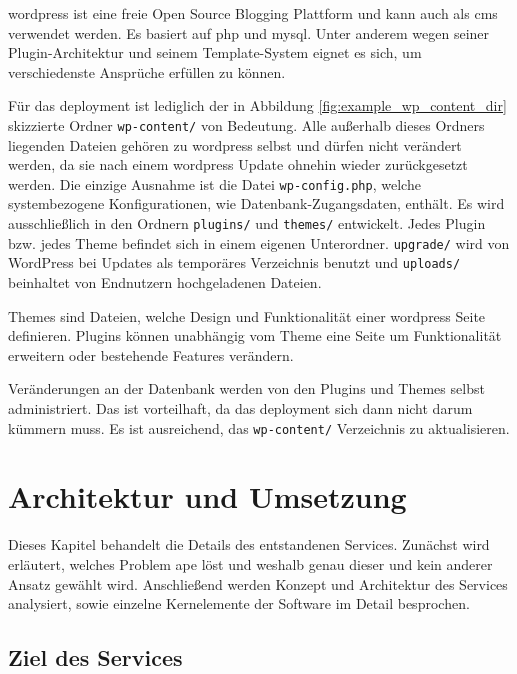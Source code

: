 \gls{wordpress} ist eine freie Open Source Blogging Plattform und kann auch als \gls{cms} verwendet werden. Es basiert auf \gls{php} und \gls{mysql}. Unter anderem wegen seiner Plugin-Architektur und seinem Template-System eignet es sich, um verschiedenste Ansprüche erfüllen zu können.

Für das \gls{deployment} ist lediglich der in Abbildung \ref{fig:example_wp_content_dir} skizzierte Ordner \lstinline!wp-content/! von Bedeutung. Alle außerhalb dieses Ordners liegenden Dateien gehören zu \gls{wordpress} selbst und dürfen nicht verändert werden, da sie nach einem \gls{wordpress} Update ohnehin wieder zurückgesetzt werden. Die einzige Ausnahme ist die Datei \lstinline!wp-config.php!, welche systembezogene Konfigurationen, wie Datenbank-Zugangsdaten, enthält. Es wird ausschließlich in den Ordnern \lstinline!plugins/! und \lstinline!themes/! entwickelt. Jedes Plugin bzw. jedes Theme befindet sich in einem eigenen Unterordner. \lstinline!upgrade/! wird von WordPress bei Updates als temporäres Verzeichnis benutzt und \lstinline!uploads/! beinhaltet von Endnutzern hochgeladenen Dateien.

Themes sind Dateien, welche Design und Funktionalität einer \gls{wordpress} Seite definieren. Plugins können unabhängig vom Theme eine Seite um Funktionalität erweitern oder bestehende Features verändern.

Veränderungen an der Datenbank werden von den Plugins und Themes selbst administriert. Das ist vorteilhaft, da das \gls{deployment} sich dann nicht darum kümmern muss. Es ist ausreichend, das \lstinline!wp-content/! Verzeichnis zu aktualisieren.




\section{Architektur und Umsetzung} %
\label{sec:architektur_und_umsetzung}

Dieses Kapitel behandelt die Details des entstandenen Services. Zunächst wird erläutert, welches Problem \gls{ape} löst und weshalb genau dieser und kein anderer Ansatz gewählt wird. Anschließend werden Konzept und Architektur des Services analysiert, sowie einzelne Kernelemente der Software im Detail besprochen.
	
\subsection{Ziel des Services} %
\label{sub:ziel_des_services}

